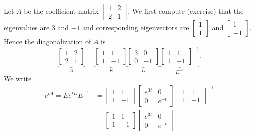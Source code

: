 \begin{example}
Let $A$ be the coefficient matrix $\left[ \begin{smallmatrix}
1 & 2 \\
2 & 1
\end{smallmatrix} \right]$.
We first compute (exercise) that the eigenvalues are 3 and $-1$ and 
corresponding eigenvectors are
$\left[ \begin{smallmatrix} 1 \\ 1 \end{smallmatrix} \right]$ and
$\left[ \begin{smallmatrix} 1 \\ -1 \end{smallmatrix} \right]$.
Hence the diagonalization of $A$ is
\begin{equation*}
\underbrace{
\begin{bmatrix}
1 & 2 \\
2 & 1
\end{bmatrix}
}_{A}
=
\underbrace{
\begin{bmatrix}
1 & 1 \\
1 & -1
\end{bmatrix}
}_{E}
\underbrace{
\begin{bmatrix}
3 & 0 \\
0 & -1
\end{bmatrix}
}_{D}
\underbrace{
\begin{bmatrix}
1 & 1 \\
1 & -1
\end{bmatrix}^{-1}
}_{E^{-1}} .
\end{equation*}
We write
\begin{equation*}
\begin{split}
e^{t A}
=
E e^{tD} E^{-1}
& =
\begin{bmatrix}
1 & 1 \\
1 & -1
\end{bmatrix}
\begin{bmatrix}
e^{3t} & 0 \\
0 & e^{-t}
\end{bmatrix}
\begin{bmatrix}
1 & 1 \\
1 & -1
\end{bmatrix}^{-1}
\\
& =
\begin{bmatrix}
1 & 1 \\
1 & -1
\end{bmatrix}
\begin{bmatrix}
e^{3t} & 0 \\
0 & e^{-t}
\end{bmatrix}

\end{split}
\end{equation*}
\end{example}
